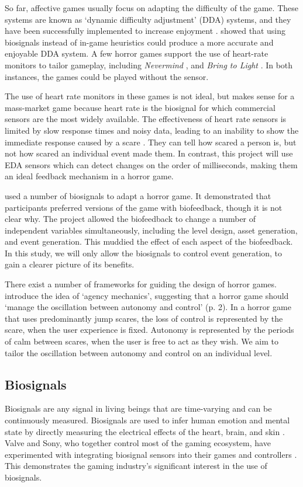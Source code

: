 \documentclass[12pt,a4paper]{article}\usepackage[]{graphicx}\usepackage[]{color}
\begin{document}
So far, affective games usually focus on adapting the difficulty of the game.
These systems are known as `dynamic difficulty adjustment' (DDA) systems, and they have been successfully implemented to increase enjoyment \citep{silva17}.
\citet{stein18} showed that using biosignals instead of in-game heuristics could produce a more accurate and enjoyable DDA system.
A few horror games support the use of heart-rate monitors to tailor gameplay, including \emph{Nevermind} \citep{nevermind}, and \emph{Bring to Light} \citep{bringtolight}.
In both instances, the games could be played without the sensor.

The use of heart rate monitors in these games is not ideal, but makes sense for a mass-market game because heart rate is the biosignal for which commercial sensors are the most widely available.
The effectiveness of heart rate sensors is limited by slow response times and noisy data, leading to an inability to show the immediate response caused by a scare \citep{azarbarzin14}.
They can tell how scared a person is, but not how scared an individual event made them.
In contrast, this project will use EDA sensors which can detect changes on the order of milliseconds, making them an ideal feedback mechanism in a horror game.

\citet{nogueira2016} used a number of biosignals to adapt a horror game.
It demonstrated that participants preferred versions of the game with biofeedback, though it is not clear why.
The project allowed the biofeedback to change a number of independent variables simultaneously, including the level design, asset generation, and event generation.
This muddied the effect of each aspect of the biofeedback.
In this study, we will only allow the biosignals to control event generation, to gain a clearer picture of its benefits.

There exist a number of frameworks for guiding the design of horror games.
\citet{habel14} introduce the idea of `agency mechanics', suggesting that a horror game should `manage the oscillation between autonomy and control' (p. 2).
In a horror game that uses predominantly jump scares, the loss of control is represented by the scare, when the user experience is fixed.
Autonomy is represented by the periods of calm between scares, when the user is free to act as they wish.
We aim to tailor the oscillation between autonomy and control on an individual level.

\subsection{Biosignals}
Biosignals are any signal in living beings that are time-varying and can be continuously measured.
Biosignals are used to infer human emotion and mental state by directly measuring the electrical effects of the heart, brain, and skin \citep{van09}.
Valve and Sony, who together control most of the gaming ecosystem, have experimented with integrating biosignal sensors into their games and controllers \citep{ambinder11, loveridge2013}.
This demonstrates the gaming industry's significant interest in the use of biosignals.
\end{document}
